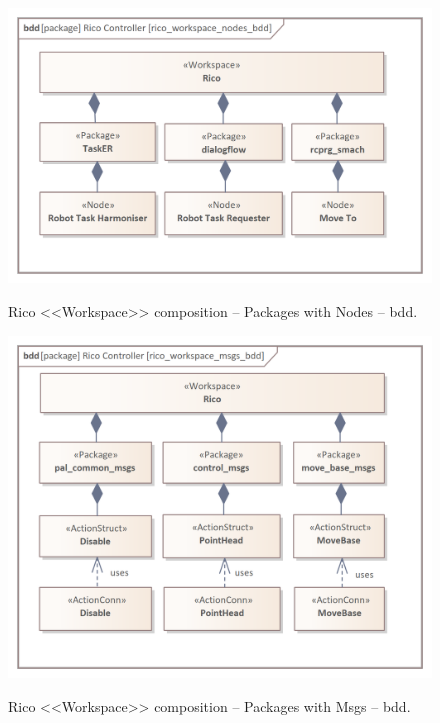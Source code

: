 \documentclass{ieeeaccess}
\begin{document}
	\begin{figure}[htb]
		\centering
		\begin{center}
			{\includegraphics[scale=0.7]{img/rico_pkg/rico_workspace_nodes_bdd.png}}
		\end{center}
		\caption{Rico <<Workspace>> composition -- Packages with Nodes -- bdd.}
		\label{fig:rico_workspace_nodes_bdd}
	\end{figure}

	\begin{figure}[htb]
		\centering
		\begin{center}
			{\includegraphics[scale=0.7]{img/rico_pkg/rico_workspace_msgs_bdd.png}}
		\end{center}
		\caption{Rico <<Workspace>> composition -- Packages with Msgs -- bdd.}
		\label{fig:rico_workspace_msgs_bdd}
	\end{figure}
	
\end{document}
